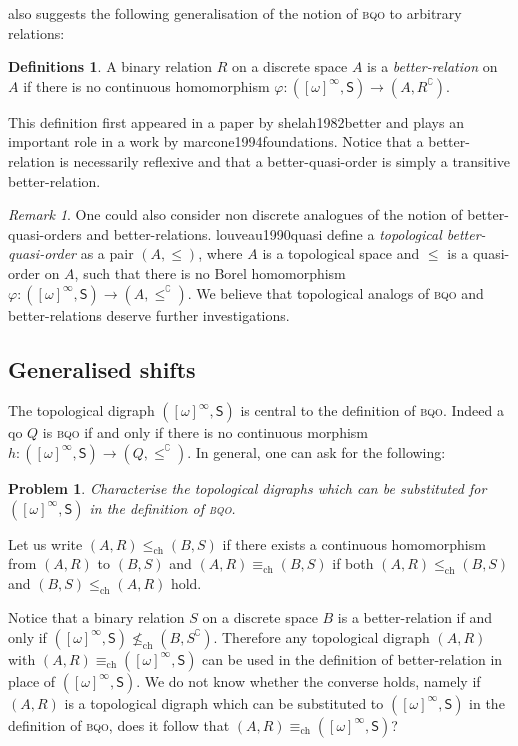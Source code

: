 \documentclass{article}%
\newcommand\textcite{}
\newcommand\Textcite{}
\theoremstyle{plain}
\newtheorem{problem}[conjecture]{Problem}
\theoremstyle{definition}
\newtheorem{definition}[theorem]{Definition}
\newtheorem{definition}[theorem]{Notation}
\newtheorem{definition}[theorem]{Notations}
\newtheorem{definition}[theorem]{Definitions}
\theoremstyle{remark}
\newtheorem{remark}[theorem]{Remark}
\newcommand{\bqo}{\textsc{bqo}}
\newcommand{\contMor}{\leq_{\text{ch}}}
\newcommand{\NcontMor}{\not\leq_{\text{ch}}}
\newcommand{\contMorEq}{\equiv_{\text{ch}}}
\newcommand{\SHIFT}{\mathsf{S}}
\newcommand{\infSub}[1]{[#1]^{\infty}}
\begin{document}
 also suggests the following generalisation of the notion of \bqo{} to arbitrary relations:

\begin{definition}
A binary relation $R$ on a discrete space $A$ is a \emph{better-relation} on $A$ if there is no continuous homomorphism $\varphi:(\infSub{\omega},\SHIFT)\to (A,R^{\complement})$.
\end{definition}

This definition first appeared in a paper by \textcite{shelah1982better} and plays an important role in a work by \textcite{marcone1994foundations}. Notice that a better-relation is necessarily reflexive and that a better-quasi-order is simply a transitive better-relation. 

\begin{remark}
One could also consider non discrete analogues of the notion of better-quasi-orders and better-relations. \Textcite{louveau1990quasi} define a \emph{topological better-quasi-order} as a pair $(A,\leq)$, where $A$ is a topological space and $\leq$ is a quasi-order on $A$, such that there is no Borel homomorphism $\varphi:(\infSub{\omega},\SHIFT)\to (A,\leq^{\complement})$. We believe that topological analogs of \bqo{} and better-relations deserve further investigations.
\end{remark}


\subsection{Generalised shifts}
The topological digraph $(\infSub{\omega},\SHIFT)$ is central to the definition of \bqo{}. Indeed a qo $Q$ is \bqo{} if and only if there is no continuous morphism $h:(\infSub{\omega},\SHIFT)\to (Q,\leq^{\complement})$. In general, one can ask for the following:

\begin{problem}\label{prob BqoDef}
Characterise the topological digraphs which can be substituted for $(\infSub{\omega},\SHIFT)$ in the definition of \bqo{}.
\end{problem}

Let us write $(A,R)\contMor (B,S)$ if there exists a continuous homomorphism from $(A,R)$ to $(B,S)$ and $(A,R)\contMorEq(B,S)$ if both $(A,R)\contMor (B,S)$ and $(B,S)\contMor (A,R)$ hold.

Notice that a binary relation $S$ on a discrete space $B$ is a better-relation if and only if $(\infSub{\omega},\SHIFT)\NcontMor (B,S^{\complement})$.
Therefore any topological digraph $(A,R)$ with $(A,R)\contMorEq (\infSub{\omega},\SHIFT)$ can be used in the definition of better-relation in place of $(\infSub{\omega},\SHIFT)$. We do not know whether the converse holds, namely if $(A,R)$ is a topological digraph which can be substituted to $(\infSub{\omega},\SHIFT)$ in the definition of \bqo{}, does it follow that $(A,R)\contMorEq (\infSub{\omega},\SHIFT)$?
\end{document}
